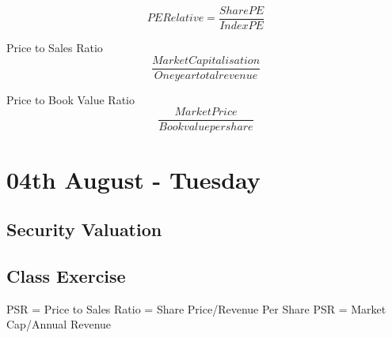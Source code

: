 \documentclass{article}
\begin{document}
\[PE Relative = \frac{Share PE}{Index PE}\]

Price to Sales Ratio
\[\frac{Market Capitalisation}{One year total revenue}\]

Price to Book Value Ratio 
\[\frac{Market Price}{Book value per share}\]



\section{04th August - Tuesday}
\subsection{Security Valuation}
\subsection{Class Exercise}
PSR = Price to Sales Ratio = Share Price/Revenue Per Share
PSR = Market Cap/Annual Revenue
\end{document}
